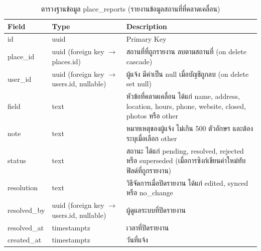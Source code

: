 \begin{table}[H]
\centering
\caption{ตารางฐานข้อมูล place\_reports (รายงานข้อมูลสถานที่ที่คลาดเคลื่อน)}
\label{tab:db_reports}
\begin{tabular}{|p{3.6cm}|p{2.6cm}|p{6.8cm}|}
\hline
\textbf{Field} & \textbf{Type} & \textbf{Description} \\
\hline
id & uuid & Primary Key \\ \hline
place\_id & uuid (foreign key $\to$ places.id) & สถานที่ที่ถูกรายงาน ลบตามสถานที่ (on delete cascade) \\ \hline
user\_id & uuid (foreign key $\to$ users.id, nullable) & ผู้แจ้ง มีค่าเป็น null เมื่อบัญชีถูกลบ (on delete set null) \\ \hline
field & text & หัวข้อที่คลาดเคลื่อน ได้แก่ name, address, location, hours, phone, website, closed, photos หรือ other \\ \hline
note & text & หมายเหตุของผู้แจ้ง ไม่เกิน 500 ตัวอักษร และต้องระบุเมื่อเลือก other \\ \hline
status & text & สถานะ ได้แก่ pending, resolved, rejected หรือ superseded (เมื่อการซิงก์เขียนค่าใหม่ทับฟิลด์ที่ถูกรายงาน) \\ \hline
resolution & text & วิธีจัดการเมื่อปิดรายงาน ได้แก่ edited, synced หรือ no\_change \\ \hline
resolved\_by & uuid (foreign key $\to$ users.id, nullable) & ผู้ดูแลระบบที่ปิดรายงาน \\ \hline
resolved\_at & timestamptz & เวลาที่ปิดรายงาน \\ \hline
created\_at & timestamptz & วันที่แจ้ง \\
\hline
\end{tabular}
\end{table}

